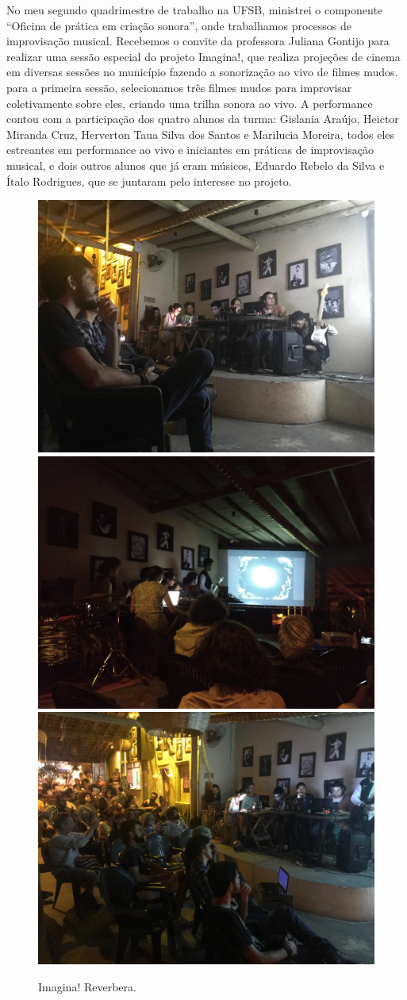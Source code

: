 No meu segundo quadrimestre de trabalho na UFSB, ministrei o componente ``Oficina de prática em criação sonora'', onde trabalhamos processos de improvisação musical. Recebemos o convite da professora Juliana Gontijo para realizar uma sessão especial do projeto Imagina!, que realiza projeções de cinema em diversas sessões no município fazendo a sonorização ao vivo de filmes mudos. para a primeira sessão, selecionamos três filmes mudos para improvisar coletivamente sobre eles, criando uma trilha sonora ao vivo. A performance contou com a participação dos quatro alunos da turma: Gislania Araújo, Heictor Miranda Cruz, Herverton Taua Silva dos Santos e Marilucia Moreira, todos eles estreantes em performance ao vivo e iniciantes em práticas de improvisação musical, e dois outros alunos que já eram músicos, Eduardo Rebelo da Silva e Ítalo Rodrigues, que se juntaram pelo interesse no projeto.
\begin{figure}

\includegraphics[width=0.7\linewidth]{pictures/cap4/imagina1a}
\includegraphics[width=0.7\linewidth]{pictures/cap4/imagina1b}
\includegraphics[width=0.7\linewidth]{pictures/cap4/imagina1c}
\caption{Imagina! Reverbera.}
\label{Fotos: Juliana Gontijo}
\label{diagram}
\end{figure}


